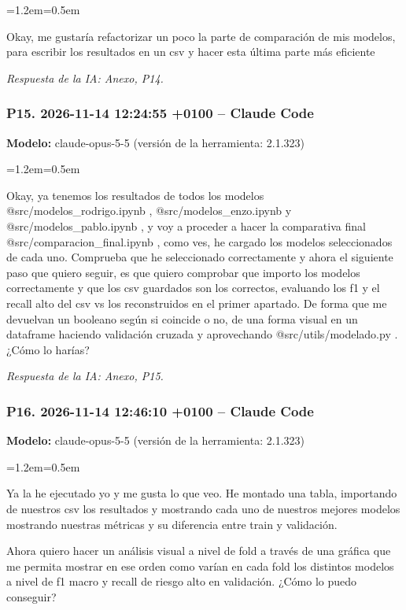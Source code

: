 \documentclass[11pt,a4paper]{article}
\newenvironment{prompt}
  {\par\smallskip\begin{list}{}{\leftmargin=1.2em\rightmargin=0.5em}\item\relax\small\color{black!80}}
  {\end{list}\smallskip}
\begin{document}
\begin{prompt}
Okay, me gustaría refactorizar un poco la parte de comparación de mis modelos, para escribir los resultados en un csv y hacer esta última parte más eficiente
\end{prompt}

\textit{Respuesta de la IA: Anexo, P14.}

\subsubsection*{P15. 2026-11-14 12:24:55 +0100 -- Claude Code}
\textbf{Modelo:} claude-opus-5-5 (versión de la herramienta: 2.1.323)

\begin{prompt}
Okay, ya tenemos los resultados de todos los modelos @src/\allowbreak{}modelos\_\allowbreak{}rodrigo.ipynb , @src/\allowbreak{}modelos\_\allowbreak{}enzo.ipynb  y @src/\allowbreak{}modelos\_\allowbreak{}pablo.ipynb ,  y voy a proceder a hacer la comparativa final @src/\allowbreak{}comparacion\_\allowbreak{}final.ipynb  , como ves, he cargado los modelos seleccionados de cada uno. Comprueba que he seleccionado correctamente y ahora el siguiente paso que quiero seguir, es que quiero comprobar que importo los modelos correctamente y que los csv guardados son los correctos, evaluando los f1 y el recall alto del csv vs los reconstruidos en el primer apartado. De forma que me devuelvan un booleano según si coincide o no, de una forma visual en un dataframe haciendo validación cruzada y aprovechando @src/\allowbreak{}utils/\allowbreak{}modelado.py  . ¿Cómo lo harías?
\end{prompt}

\textit{Respuesta de la IA: Anexo, P15.}

\subsubsection*{P16. 2026-11-14 12:46:10 +0100 -- Claude Code}
\textbf{Modelo:} claude-opus-5-5 (versión de la herramienta: 2.1.323)

\begin{prompt}
Ya la he ejecutado yo y me gusta lo que veo. He montado una tabla, importando de nuestros csv los resultados y mostrando cada uno de nuestros mejores modelos mostrando nuestras métricas y su diferencia entre train y validación.

Ahora quiero hacer un análisis visual a nivel de fold a través de una gráfica que me permita mostrar en ese orden como varían en cada fold los distintos modelos a nivel de f1 macro y recall de riesgo alto en validación. ¿Cómo lo puedo conseguir?
\end{prompt}
\end{document}
